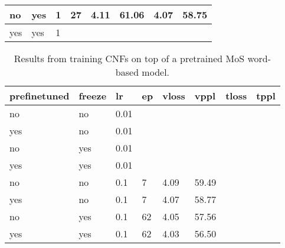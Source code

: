 \begin{table}[]
\begin{tabular}{|l|l|l|l|l|l|l|l|}
no                                              & yes                                       & 1                                     & 27                                    & 4.11                                     & 61.06                                   & 4.07                                     & 58.75                          \\ \hline
yes                                             & yes                                       & 1                                     &                                       &                                          &                                         &                                          &                                \\ \hline
\end{tabular}
\end{table}


\begin{table}[]
\centering
\caption{Results from training CNFs on top of a pretrained MoS word-based model.}
\begin{tabular}{|l|l|l|l|l|l|l|l|}
\hline
\textbf{prefinetuned} & \textbf{freeze} & \textbf{lr} & \textbf{ep} & \textbf{vloss} & \textbf{vppl} & \textbf{tloss} & \textbf{tppl} \\ \hline
no                    & no              & 0.01        &             &                &               &                &      \\ \hline
yes                   & no              & 0.01        &             &                &               &                &      \\ \hline
no                    & yes             & 0.01        &             &                &               &                &      \\ \hline
yes                   & yes             & 0.01        &             &                &               &                &      \\ \hline
no                    & no              & 0.1         & 7           & 4.09           & 59.49         &                &      \\ \hline
yes                   & no              & 0.1         & 7           & 4.07           & 58.77         &                &      \\ \hline
no                    & yes             & 0.1         & 62          & 4.05           & 57.56         &                &      \\ \hline
yes                   & yes             & 0.1         & 62          & 4.03           & 56.50         &                &      \\ \hline
\end{tabular}
\end{table}

